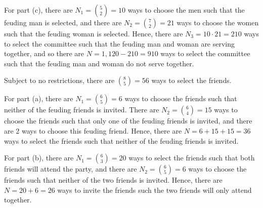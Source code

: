 \documentclass[a4paper,12pt]{article}
\begin{document}
\pagebreak
For part (c), there are $N_1 = \binom{5}{2} = 10$ ways to choose the men such that the feuding man is selected, and there are $N_2 = \binom{7}{2} = 21$ ways to choose the women such that the feuding woman is selected. Hence, there are $N_3 = 10 \cdot 21 = 210$ ways to select the committee such that the feuding man and woman are serving together, and so there are $N = 1,120 - 210 = 910$ ways to select the committee such that the feuding man and woman do not serve together. 

\vspace{4mm}

\vspace{2mm}
Subject to no restrictions, there are $\binom{8}{5} = 56$ ways to select the friends. 

For part (a), there are $N_1 = \binom{6}{5} = 6$ ways to choose the friends such that neither of the feuding friends is invited. There are $N_2 = \binom{6}{4} = 15$ ways to choose the friends such that only one of the feuding friends is invited, and there are 2 ways to choose this feuding friend. Hence, there are $N = 6 + 15 + 15 = 36$ ways to select the friends such that neither of the feuding friends is invited.

For part (b), there are $N_1 = \binom{6}{3} = 20$ ways to select the friends such that both friends will attend the party, and there are $N_2 = \binom{6}{5} = 6$ ways to choose the friends such that neither of the two friends is invited. Hence, there are $N = 20 +6 = 26$ ways to invite the friends such the two friends will only attend together.

\vspace{4mm}
\end{document}

